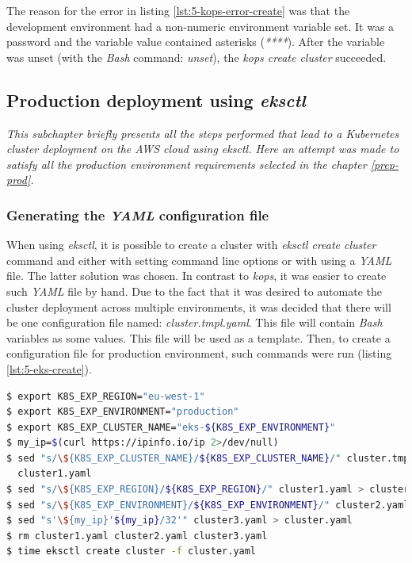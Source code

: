 The reason for the error in listing \ref{lst:5-kops-error-create} was that the development environment had a non-numeric environment variable set. It was a password and the variable value contained asterisks (\textit{****}). After the variable was unset (with the \textit{Bash} command: \textit{unset}), the \textit{kops create cluster} succeeded.


\subsection{Production deployment using \textit{eksctl}}
\textit{This subchapter briefly presents all the steps performed that lead to a Kubernetes cluster deployment on the AWS cloud using \textit{eksctl}. Here an attempt was made to satisfy all the production environment requirements selected in the chapter \ref{prep-prod}.}
\\

\subsubsection{Generating the \textit{YAML} configuration file}
When using \textit{eksctl}, it is possible to create a cluster with \textit{eksctl create cluster} command and either with setting command line options or with using a \textit{YAML} file. The latter solution was chosen. In contrast to \textit{kops}, it was easier to create such \textit{YAML} file by hand. Due to the fact that it was desired to automate the cluster deployment across multiple environments, it was decided that there will be one configuration file named: \textit{cluster.tmpl.yaml}. This file will contain \textit{Bash} variables as some values. This file will be used as a template. Then, to create a configuration file for production environment, such commands were run (listing \ref{lst:5-eks-create}).
\begin{lstlisting}[basicstyle=\scriptsize,xleftmargin=0cm,label=lst:5-eks-create,caption={Creating \textit{eksctl} configuration},captionpos=b,language=Bash ]
$ export K8S_EXP_REGION="eu-west-1"
$ export K8S_EXP_ENVIRONMENT="production"
$ export K8S_EXP_CLUSTER_NAME="eks-${K8S_EXP_ENVIRONMENT}"
$ my_ip=$(curl https://ipinfo.io/ip 2>/dev/null)
$ sed "s/\${K8S_EXP_CLUSTER_NAME}/${K8S_EXP_CLUSTER_NAME}/" cluster.tmpl.yaml >\
  cluster1.yaml
$ sed "s/\${K8S_EXP_REGION}/${K8S_EXP_REGION}/" cluster1.yaml > cluster2.yaml
$ sed "s/\${K8S_EXP_ENVIRONMENT}/${K8S_EXP_ENVIRONMENT}/" cluster2.yaml > cluster3.yaml
$ sed "s'\${my_ip}'${my_ip}/32'" cluster3.yaml > cluster.yaml
$ rm cluster1.yaml cluster2.yaml cluster3.yaml
$ time eksctl create cluster -f cluster.yaml
\end{lstlisting}

